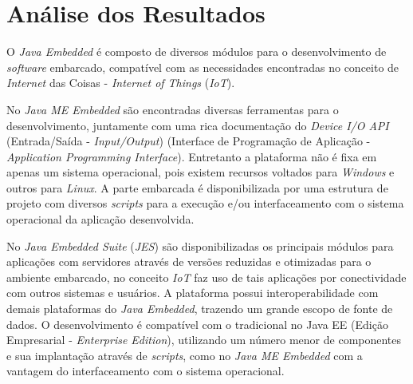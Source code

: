 %


\chapter{Análise dos Resultados}

O \textit{Java Embedded} é composto de diversos módulos para o desenvolvimento de \textit{software} embarcado, compatível com as necessidades encontradas no conceito de \textit{Internet} das Coisas - \textit{Internet of Things} (\textit{IoT}).

No \textit{Java ME Embedded} são encontradas diversas ferramentas para o desenvolvimento, juntamente com uma rica documentação do \textit{Device I/O API} (Entrada/Saída - \textit{Input/Output}) (Interface de Programação de Aplicação - \textit{Application Programming Interface}). Entretanto a plataforma não é fixa em apenas um sistema operacional, pois existem recursos voltados para \textit{Windows} e outros para \textit{Linux}. A parte embarcada é disponibilizada por uma estrutura de projeto com diversos \textit{scripts} para a execução e/ou interfaceamento com o sistema operacional da aplicação desenvolvida.

No \textit{Java Embedded Suite} (\textit{JES}) são disponibilizadas os principais módulos para aplicações com servidores através de versões reduzidas e otimizadas para o ambiente embarcado, no conceito \textit{IoT} faz uso de tais aplicações por conectividade com outros sistemas e usuários. A plataforma possui interoperabilidade com demais plataformas do \textit{Java Embedded}, trazendo um grande escopo de fonte de dados. O desenvolvimento é compatível com o tradicional no Java EE (Edição Empresarial - \textit{Enterprise Edition}), utilizando um número menor de componentes e sua implantação através de \textit{scripts}, como no \textit{Java ME Embedded} com a vantagem do interfaceamento com o sistema operacional.

